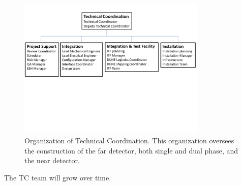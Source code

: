 \begin{figure}[htb]
  \begin{center}
    \includegraphics[width=0.8\textwidth]{far-detector-generic/figures/TP_TC_Org_Chart}
    \caption{Organization of Technical Coordination. This organization
      oversees the construction of the far detector, both single and
      dual phase, and the near detector.}
    \label{fig:TC_orgchart}
  \end{center}
\end{figure}
The TC team will grow over time.

